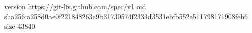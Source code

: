 version https://git-lfs.github.com/spec/v1
oid sha256:a258d0ae0f221848263e9b31730574f2333d3531ebfb552e511798171908feb6
size 43840
